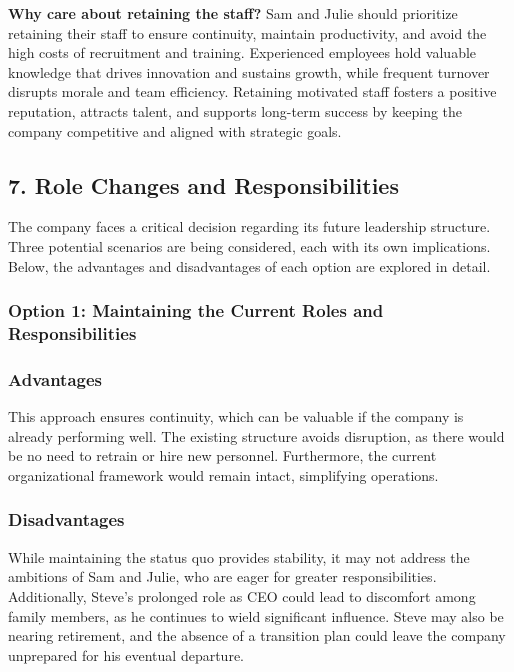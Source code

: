 \documentclass[a4paper,10pt]{article}
\begin{document}
\textbf{Why care about retaining the staff?}\newline
Sam and Julie should prioritize retaining their staff to ensure continuity, maintain productivity, and avoid the high costs of recruitment and training. Experienced employees hold valuable knowledge that drives innovation and sustains growth, while frequent turnover disrupts morale and team efficiency. Retaining motivated staff fosters a positive reputation, attracts talent, and supports long-term success by keeping the company competitive and aligned with strategic goals.

\subsection{7. Role Changes and Responsibilities}

The company faces a critical decision regarding its future leadership structure. Three potential scenarios are being considered, each with its own implications. Below, the advantages and disadvantages of each option are explored in detail.

\subsubsection*{Option 1: Maintaining the Current Roles and Responsibilities}

\subsubsection*{Advantages}
This approach ensures continuity, which can be valuable if the company is already performing well. The existing structure avoids disruption, as there would be no need to retrain or hire new personnel. Furthermore, the current organizational framework would remain intact, simplifying operations.

\subsubsection*{Disadvantages}
While maintaining the status quo provides stability, it may not address the ambitions of Sam and Julie, who are eager for greater responsibilities. Additionally, Steve’s prolonged role as CEO could lead to discomfort among family members, as he continues to wield significant influence. Steve may also be nearing retirement, and the absence of a transition plan could leave the company unprepared for his eventual departure.
\end{document}
